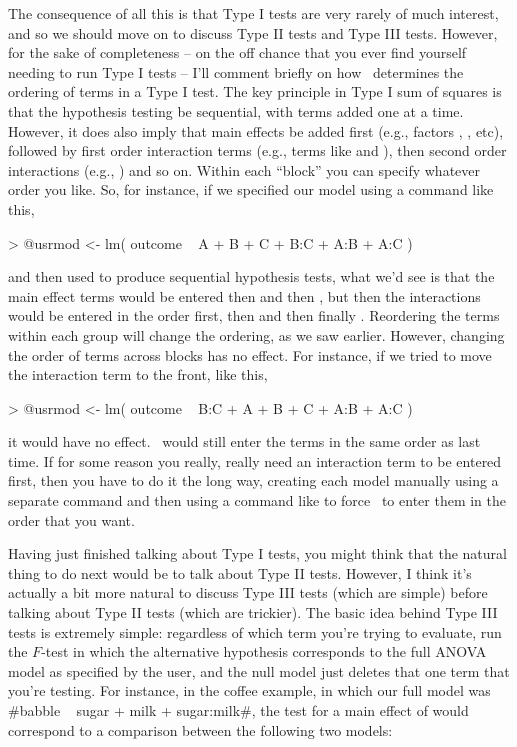The consequence of all this is that Type I tests are very rarely of much interest, and so we should move on to discuss Type II tests and Type III tests. However, for the sake of completeness -- on the off chance that you ever find yourself needing to run Type I tests -- I'll comment briefly on how \R\ determines the ordering of terms in a Type I test. The key principle in Type I sum of squares is that the hypothesis testing be sequential, with terms added one at a time. However, it does also imply that main effects be added first (e.g., factors , ,  etc), followed by first order interaction terms (e.g., terms like  and ), then second order interactions (e.g., ) and so on. Within each ``block'' you can specify whatever order you like. So, for instance, if we specified our model using a command like this,
\begin{rblock1}
> @usr{mod <- lm( outcome ~ A + B + C + B:C + A:B + A:C )}
\end{rblock1}
and then used  to produce sequential hypothesis tests, what we'd see is that the main effect terms would be entered  then  and then , but then the interactions would be entered in the order  first, then  and then finally . Reordering the terms within each group will change the ordering, as we saw earlier. However, changing the order of terms across blocks has no effect. For instance, if we tried to move the interaction term  to the front, like this,
\begin{rblock1}
> @usr{mod <- lm( outcome ~ B:C + A + B + C + A:B + A:C )}
\end{rblock1}
it would have no effect. \R\ would still enter the terms in the same order as last time. If for some reason you really, really need an interaction term to be entered first, then you have to do it the long way, creating each model manually using a separate  command and then using a command like  to force \R\ to enter them in the order that you want. 



Having just finished talking about Type I tests, you might think that the natural thing to do next would be to talk about Type II tests. However, I think it's actually a bit more natural to discuss Type III tests (which are simple) before talking about Type II tests (which are trickier). The basic idea behind Type III tests is extremely simple: regardless of which term you're trying to evaluate, run the $F$-test in which the alternative hypothesis corresponds to the full ANOVA model as specified by the user, and the null model just deletes that one term that you're testing. For instance, in the coffee example, in which our full model was \rtextverb#babble ~ sugar + milk + sugar:milk#, the test for a main effect of  would correspond to a comparison between the following two models:

